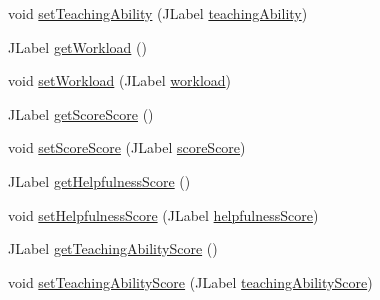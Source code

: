 \begin{DoxyCompactItemize}
\item 
void \mbox{\hyperlink{classcom_1_1_b_n_u_1_1pages_1_1message__board_1_1_message_board_model_aa7c156a4d25abc337dba065239af0bdc}{set\+Teaching\+Ability}} (J\+Label \mbox{\hyperlink{classcom_1_1_b_n_u_1_1pages_1_1message__board_1_1_message_board_model_a5c09897df71966f2fc35733353351b5c}{teaching\+Ability}})
\item 
J\+Label \mbox{\hyperlink{classcom_1_1_b_n_u_1_1pages_1_1message__board_1_1_message_board_model_a428b831f97c9cd92cf3d13b2cb67a309}{get\+Workload}} ()
\item 
void \mbox{\hyperlink{classcom_1_1_b_n_u_1_1pages_1_1message__board_1_1_message_board_model_adbaf22e03cd158e0196b795b742780ae}{set\+Workload}} (J\+Label \mbox{\hyperlink{classcom_1_1_b_n_u_1_1pages_1_1message__board_1_1_message_board_model_a9ad329feae4edd40fe0527b40a468da1}{workload}})
\item 
J\+Label \mbox{\hyperlink{classcom_1_1_b_n_u_1_1pages_1_1message__board_1_1_message_board_model_a97b00fe66e0336baea16c57ab103c2f8}{get\+Score\+Score}} ()
\item 
void \mbox{\hyperlink{classcom_1_1_b_n_u_1_1pages_1_1message__board_1_1_message_board_model_a0e99faaf2cd22133c7ad3279327ab908}{set\+Score\+Score}} (J\+Label \mbox{\hyperlink{classcom_1_1_b_n_u_1_1pages_1_1message__board_1_1_message_board_model_adfd336301097c9aa22c5bc0b624eb284}{score\+Score}})
\item 
J\+Label \mbox{\hyperlink{classcom_1_1_b_n_u_1_1pages_1_1message__board_1_1_message_board_model_a991c7b237c5aac2e6bcb39f0a9f65105}{get\+Helpfulness\+Score}} ()
\item 
void \mbox{\hyperlink{classcom_1_1_b_n_u_1_1pages_1_1message__board_1_1_message_board_model_a6701469343f2d7380494ec1eb9e1f531}{set\+Helpfulness\+Score}} (J\+Label \mbox{\hyperlink{classcom_1_1_b_n_u_1_1pages_1_1message__board_1_1_message_board_model_a41e4d4bad9f48ce647a86a3983a106eb}{helpfulness\+Score}})
\item 
J\+Label \mbox{\hyperlink{classcom_1_1_b_n_u_1_1pages_1_1message__board_1_1_message_board_model_afd92dc7e0e25314b6b0aa8778c7f1238}{get\+Teaching\+Ability\+Score}} ()
\item 
void \mbox{\hyperlink{classcom_1_1_b_n_u_1_1pages_1_1message__board_1_1_message_board_model_a5d46ce2de07f5f4316156a3e5af2d838}{set\+Teaching\+Ability\+Score}} (J\+Label \mbox{\hyperlink{classcom_1_1_b_n_u_1_1pages_1_1message__board_1_1_message_board_model_a4843957afdd3ed49451502d67d362dc6}{teaching\+Ability\+Score}})
\item 

\end{DoxyCompactItemize}
